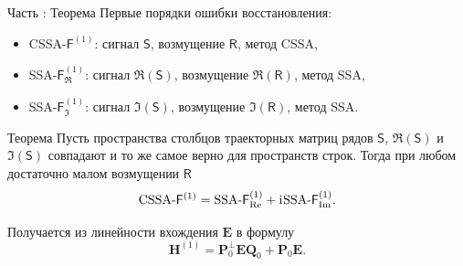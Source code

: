 \documentclass[10pt, ucs, notheorems, handout]{beamer}
\newcommand{\tX}[1]{\mathsf{#1}}
\newcommand{\iu}{\mathrm{i}\mkern1mu}
\newcommand{\RomanNumeralCaps}[1]
{\MakeUppercase{\romannumeral #1}}
\begin{document}
\begin{frame}{Часть \RomanNumeralCaps{2}: Теорема}
	Первые порядки ошибки восстановления:
	\begin{itemize}
	\item CSSA-$\tX{F}^{(1)}$: сигнал $\tX{S}$, возмущение $\tX{R}$, метод CSSA,
	\item SSA-$\tX{F}^{(1)}_{\Re}$: сигнал $\Re(\tX{S})$, возмущение $\Re(\tX{R})$, метод SSA,	
	\item SSA-$\tX{F}^{(1)}_{\Im}$: сигнал $\Im(\tX{S})$, возмущение $\Im(\tX{R})$, метод SSA.
	\end{itemize}
    
    \begin{block}{Теорема \label{th:sum}}
        Пусть пространства столбцов траекторных матриц рядов $\tX{S}$, $\Re(\tX{S})$ и $\Im(\tX{S})$ совпадают и то же самое верно для пространств строк.
    Тогда при любом достаточно малом возмущении $\tX{R}$
    $$\text{CSSA-}\tX{F}^{(1)} = \text{SSA-}\tX{F}^{(1)}_{\Re} + \iu\text{SSA-}\tX{F}^{(1)}_{\Im}.$$
    \end{block}
    Получается из линейности вхождения $\mathbf{E}$ в формулу
    $$\mathbf{H}^{(1)} = \mathbf{P}^{\perp}_0 \mathbf{E} \mathbf{Q}_0 + \mathbf{P}_0 \mathbf{E}.$$
\end{frame}

%
%
%
%
%
\end{document}
